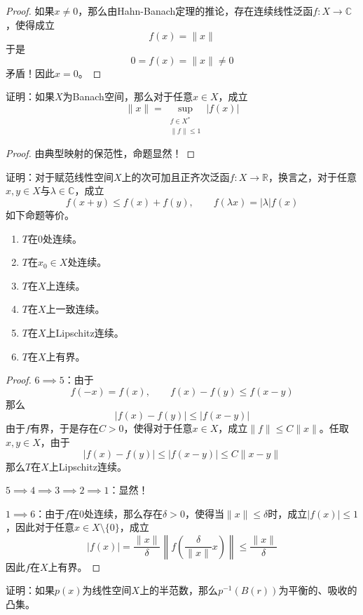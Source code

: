 \documentclass[lang = cn, scheme = chinese, 10pt]{elegantbook}
\newcommand{\R}{\mathbb{R}}  %
\newcommand{\C}{\mathbb{C}}  %
\begin{document}
\begin{proof}
	如果$x\ne 0$，那么由Hahn-Banach定理的推论，存在连续线性泛函$f:X\to\C$，使得成立
	$$
	f(x)=\|x\|
	$$
	于是
	$$
	0=f(x)=\|x\|\ne 0
	$$
	矛盾！因此$x=0$。
\end{proof}

\begin{proposition}
	证明：如果$X$为Banach空间，那么对于任意$x\in X$，成立
	$$
	\|x\|=\sup_{\substack{f\in X^*\\\|f\|\le 1}}|f(x)|
	$$
\end{proposition}

\begin{proof}
	由典型映射的保范性，命题显然！
\end{proof}

\begin{proposition}
	证明：对于赋范线性空间$X$上的次可加且正齐次泛函$f:X\to \R$，换言之，对于任意$x,y\in X$与$\lambda\in\C$，成立
	$$
	f(x+y)\le f(x)+f(y),\qquad 
	f(\lambda x)=|\lambda|f(x)
	$$
	如下命题等价。
	\begin{enumerate}
		\item $T$在$0$处连续。
		\item $T$在$x_0\in X$处连续。
		\item $T$在$X$上连续。
		\item $T$在$X$上一致连续。
		\item $T$在$X$上Lipschitz连续。
		\item $T$在$X$上有界。
	\end{enumerate}
\end{proposition}

\begin{proof}
	$6\implies 5$：由于
	$$
	f(-x)=f(x),\qquad f(x)-f(y)\le f(x-y)
	$$
	那么
	$$
	|f(x)-f(y)|\le |f(x-y)|
	$$
	由于$f$有界，于是存在$C>0$，使得对于任意$x\in X$，成立$\|f\|\le C\|x\|$。任取$x,y\in X$，由于
	$$
	|f(x)-f(y)|\le |f(x-y)|\le C\|x-y\|
	$$
	那么$T$在$X$上Lipschitz连续。
	
	$5\implies 4\implies 3\implies 2\implies 1$：显然！
	
	$1\implies 6$：由于$f$在$0$处连续，那么存在$\delta>0$，使得当$\|x\|\le \delta$时，成立$|f(x)|\le 1$，因此对于任意$x\in X\setminus\{0\}$，成立
	$$
	|f(x)|=\frac{\|x\|}{\delta}\left\| f\left(\frac{\delta}{\|x\|}x\right) \right\|\le \frac{\|x\|}{\delta}
	$$
	因此$f$在$X$上有界。
\end{proof}

\begin{proposition}
	证明：如果$p(x)$为线性空间$X$上的半范数，那么$p^{-1}(B(r))$为平衡的、吸收的凸集。
\end{proposition}
\end{document}
